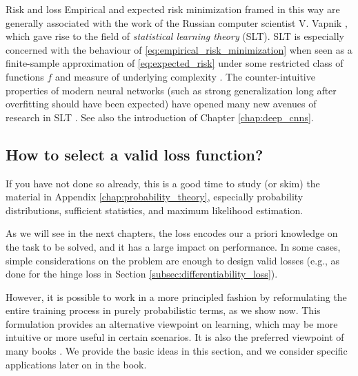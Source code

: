 \begin{supportbox}{Risk and loss}
Empirical and expected risk minimization framed in this way are generally associated with the work of the Russian computer scientist V. Vapnik \cite{vapnik2013nature}, which gave rise to the field of \textit{statistical learning theory} (SLT). SLT is especially concerned with the behaviour of \eqref{eq:empirical_risk_minimization} when seen as a finite-sample approximation of \eqref{eq:expected_risk} under some restricted class of functions $f$ and measure of underlying complexity \cite{poggio2003mathematics,shalev2014understanding,mohri2018foundations}. The counter-intuitive properties of modern neural networks (such as strong generalization long after overfitting should have been expected) have opened many new avenues of research in SLT \cite{poggio2020theoretical}. See also the introduction of Chapter \ref{chap:deep_cnns}.
\end{supportbox}

\subsection{How to select a valid loss function?} 
\label{subsec:how_to_select_a_loss}

\begin{tcolorbox}
If you have not done so already, this is a good time to study (or skim) the material in Appendix \ref{chap:probability_theory}, especially probability distributions, sufficient statistics, and maximum likelihood estimation.
\end{tcolorbox}

As we will see in the next chapters, the loss encodes our a priori knowledge on the task to be solved, and it has a large impact on performance. In some cases, simple considerations on the problem are enough to design valid losses (e.g., as done for the hinge loss in Section \ref{subsec:differentiability_loss}).

However, it is possible to work in a more principled fashion by reformulating the entire training process in purely probabilistic terms, as we show now. This formulation provides an alternative viewpoint on learning, which may be more intuitive or more useful in certain scenarios. It is also the preferred viewpoint of many books \cite{bishop2024deep}. We provide the basic ideas in this section, and we consider specific applications later on in the book.

